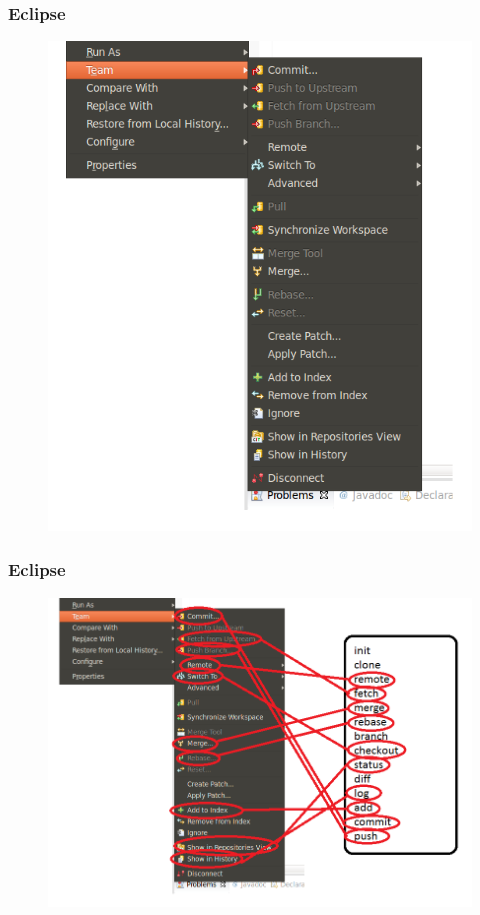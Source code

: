 \documentclass{beamer}
\begin{document}
\begin{frame}
    \frametitle{Eclipse}
    \begin{figure}[h!]
        \begin{center}
            \includegraphics[scale=0.55]{eclipse1.png}
        \end{center}
    \end{figure}
\end{frame}

\begin{frame}
    \frametitle{Eclipse}
    \begin{figure}[h!]
        \begin{center}
            \includegraphics[scale=0.5]{eclipse2.png}
        \end{center}
    \end{figure}
\end{frame}
\end{document}
